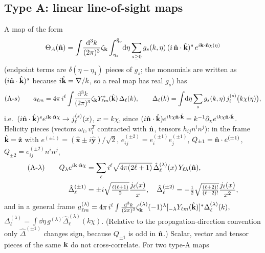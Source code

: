 \subsection{Type A: linear line-of-sight maps}
\label{sec:typeA}
A map of the form
\begin{equation}
\Theta_A(\hat{\mathbf n})=\int\!\frac{\mathrm d^3k}{(2\pi)^3}\zeta_{\mathbf k}\int_{\eta_*}^{\bar\eta_o}\!\mathrm d\eta\sum_{s\ge0}g_s(k,\eta)\,(i\,\hat{\mathbf n}\cdot\hat{\mathbf k})^s\,e^{i\mathbf k\cdot\hat{\mathbf n}\chi(\eta)}
\label{eq:typeA}
\end{equation}
(endpoint terms are $\delta(\eta-\eta_1)$ pieces of $g_s$; the monomials are written as $(i\hat{\mathbf n}\cdot\hat{\mathbf k})^s$
because $i\hat{\mathbf k}=\nabla/k$, so a real map has real $g_s$) has
\begin{equation}
\text{(A-$s$)}\qquad a_{\ell m}=4\pi\,i^\ell\int\!\frac{\mathrm d^3k}{(2\pi)^3}\zeta_{\mathbf k}Y^*_{\ell m}(\hat{\mathbf k})\,\Delta_\ell(k),\qquad
\Delta_\ell(k)=\int\!\mathrm d\eta\sum_sg_s(k,\eta)\,j_\ell^{(s)}\big(k\chi(\eta)\big),
\label{eq:ruleA}
\end{equation}
i.e.\ $(i\hat{\mathbf n}\cdot\hat{\mathbf k})^se^{i\mathbf k\cdot\hat{\mathbf n}\chi}\to j_\ell^{(s)}(x)$, $x=k\chi$, since $(i\hat{\mathbf n}\cdot\hat{\mathbf k})e^{ik\chi\hat{\mathbf n}\cdot\hat{\mathbf k}}=k^{-1}\partial_\chi e^{ik\chi\hat{\mathbf n}\cdot\hat{\mathbf k}}$.
Helicity pieces (vectors $\omega_i,v^T_i$ contracted with $\hat{\mathbf n}$, tensors $h_{ij}n^in^j$): in the frame
$\hat{\mathbf k}=\hat{\mathbf z}$ with $e^{(\pm1)}=(\hat{\mathbf x}\pm i\hat{\mathbf y})/\sqrt2$, $e^{(\pm2)}_{ij}=e^{(\pm1)}_ie^{(\pm1)}_j$,
$Q_{\pm1}=\hat{\mathbf n}\cdot e^{(\pm1)}$, $Q_{\pm2}=e^{(\pm2)}_{ij}n^in^j$,
\begin{equation}
\begin{split}\text{(A-$\lambda$)}\qquad Q_\lambda e^{i\mathbf k\cdot\hat{\mathbf n}\chi}&=\sum_\ell i^\ell\sqrt{4\pi(2\ell+1)}\,\hat\Delta^{(\lambda)}_\ell(x)\,Y_{\ell\lambda}(\hat{\mathbf n}),\\
\hat\Delta^{(\pm1)}_\ell&=\pm i\sqrt{\tfrac{\ell(\ell+1)}2}\frac{j_\ell(x)}x,\quad
\hat\Delta^{(\pm2)}_\ell=-\tfrac12\sqrt{\tfrac{(\ell+2)!}{(\ell-2)!}}\frac{j_\ell(x)}{x^2},\end{split}
\label{eq:ruleAlambda}
\end{equation}
and in a general frame $a^{(\lambda)}_{\ell m}=4\pi\,i^\ell\int\frac{\mathrm d^3k}{(2\pi)^3}\zeta^{(\lambda)}_{\mathbf k}(-1)^\lambda[{}_{-\lambda}Y_{\ell m}(\hat{\mathbf k})]^*\Delta^{(\lambda)}_\ell(k)$,
$\Delta^{(\lambda)}_\ell=\int\dd\eta\,g^{(\lambda)}\hat\Delta^{(\lambda)}_\ell(k\chi)$.  (Relative to the propagation-direction convention only
$\hat\Delta^{(\pm1)}$ changes sign, because $Q_{\pm1}$ is odd in $\hat{\mathbf n}$.)  Scalar, vector and tensor pieces
of the same $\mathbf k$ do not cross-correlate.  For two type-A maps
